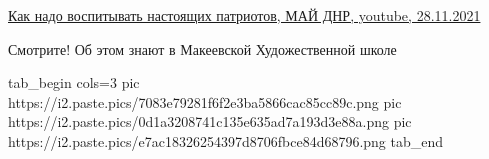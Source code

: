  
 
 
 
 

\href{https://www.youtube.com/watch?v=9nDXGQB8yB0&t=911s}{%
Как надо воспитывать настоящих патриотов, МАЙ ДНР, youtube, 28.11.2021%
}

Смотрите! Об этом знают в Макеевской Художественной школе

\ifcmt
  tab_begin cols=3
     pic https://i2.paste.pics/7083e79281f6f2e3ba5866cac85cc89c.png
		 pic https://i2.paste.pics/0d1a3208741c135e635ad7a193d3e88a.png
		 pic https://i2.paste.pics/e7ac18326254397d8706fbce84d68796.png
  tab_end
\fi
